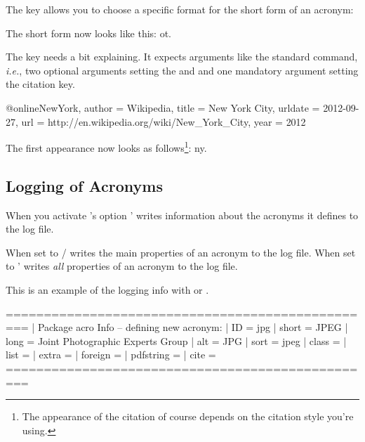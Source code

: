 \documentclass{acro-manual}
\newcommand*\latin[1]{\textit{#1}}
\begin{document}
The  key allows you to choose a specific format for the
short form of an acronym:
\begin{sourcecode}
\end{sourcecode}
The short form now looks like this: \acs{ot}.

The  key needs a bit explaining.  It expects arguments like the
standard  command, \latin{i.e.}, two optional arguments setting the
 and  and one mandatory argument setting the
citation key.
\begin{sourcecode}
\end{sourcecode}

\begin{sourcecode}[sourcecode-options={style=cnltx-bibtex}]
  @online{NewYork,
    author  = {Wikipedia},
    title   = {New York City},
    urldate = {2012-09-27},
    url     = {http://en.wikipedia.org/wiki/New_York_City},
    year    = {2012}
  }
\end{sourcecode}
The first appearance now looks as follows\footnote{The appearance of the
  citation of course depends on the citation style you're using.}: \acf{ny}.

\subsection{Logging of Acronyms}
When you activate \acro's option  \acro' writes
information about the acronyms it defines to the log file.
\begin{options}
    When set to / \acro{} writes the main properties
    of an acronym to the log file.  When set to  \acro' writes
    \emph{all}  properties of an acronym to the log file.
\end{options}

This is an example of the logging info with  or
.
\begin{sourcecode}
  =================================================
  | Package acro Info -- defining new acronym:
  |   ID = {jpg}
  |   short = {JPEG}
  |   long = {Joint Photographic Experts Group}
  |   alt = {JPG}
  |   sort = {jpeg}
  |   class = {}
  |   list = {}
  |   extra = {}
  |   foreign = {}
  |   pdfstring = {}
  |   cite = {}
  =================================================
\end{sourcecode}
\end{document}
